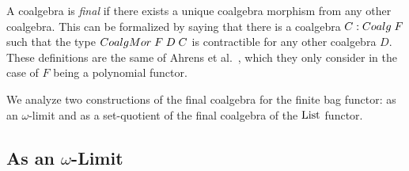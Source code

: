 \documentclass[final,a4paper,USenglish,cleveref]{lipics-v2021}
\begin{document}
A coalgebra is \emph{final} if there exists a unique coalgebra morphism from any other coalgebra. This can be formalized by saying that there is a coalgebra $C : \Coalg\;F$ such that the type $\CoalgMor\;F\;D\;C$ is contractible for any other coalgebra $D$. These definitions are the same of Ahrens et al.~\cite{Ahrens2015}, which they only consider in the case of $F$ being a polynomial functor.

We analyze two constructions of the final coalgebra for the finite bag functor: as an $\omega$-limit %
and as a set-quotient of the final coalgebra of the $\List$ functor. %

\subsection{As an \texorpdfstring{\ensuremath{\omega}}{ω}-Limit}\label{sec:final-limit-set}
\end{document}
